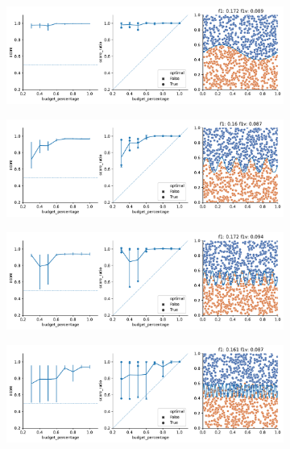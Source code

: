\begin{figure}
\begin{subfigure}{.5\textwidth}
    \end{subfigure}%
    \hfill
    \begin{subfigure}{.5\textwidth}
        \centering
        \includegraphics[width=\textwidth]{img/2d/10.pdf}
    \end{subfigure}%
    \begin{subfigure}{.5\textwidth}
        \centering
        \includegraphics[width=\textwidth]{img/2d/12.pdf}
    \end{subfigure}%
    \hfill
    \begin{subfigure}{.5\textwidth}
        \centering
        \includegraphics[width=\textwidth]{img/2d/13.pdf}
    \end{subfigure}%
    \begin{subfigure}{.5\textwidth}
        \centering
        \includegraphics[width=\textwidth]{img/2d/14.pdf}

\end{subfigure}
\end{figure}
